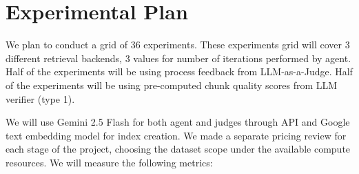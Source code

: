 \documentclass[11pt]{article}
\begin{document}





\section{Experimental Plan}
We plan to conduct a grid of 36 experiments. These experiments grid will cover 3 different retrieval backends, 3 values for number of iterations performed by agent. Half of the experiments will be using process feedback from LLM-as-a-Judge. Half of the experiments will be using pre-computed chunk quality scores from LLM verifier (type 1). 

\noindent
We will use Gemini 2.5 Flash for both agent and judges through API and Google text embedding model for index creation. We made a separate pricing review for each stage of the project, choosing the dataset scope under the available compute resources.
We will measure the following metrics:
\end{document}
